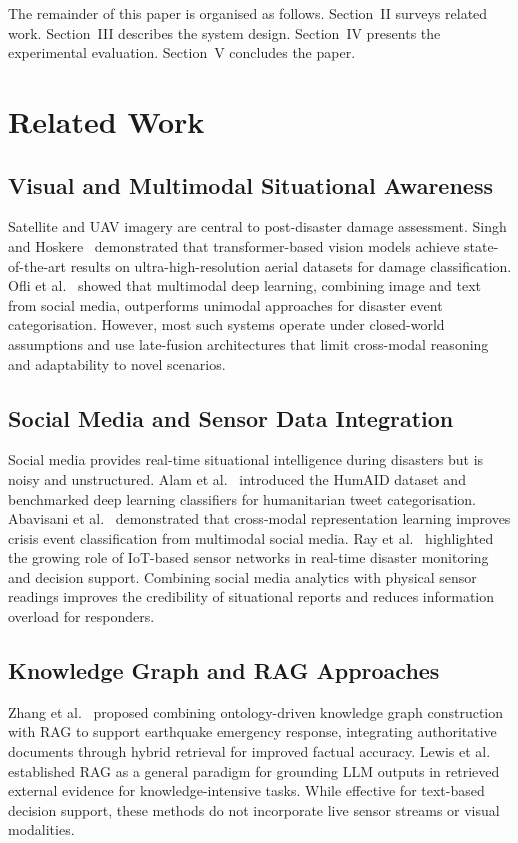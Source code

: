 \documentclass[conference]{IEEEtran}
\begin{document}
The remainder of this paper is organised as follows. Section~II surveys
related work. Section~III describes the system design. Section~IV presents
the experimental evaluation. Section~V concludes the paper.

\section{Related Work}

\subsection{Visual and Multimodal Situational Awareness}
Satellite and UAV imagery are central to post-disaster damage assessment.
Singh and Hoskere~\cite{b15} demonstrated that transformer-based vision models
achieve state-of-the-art results on ultra-high-resolution aerial datasets for
damage classification. Ofli et al.~\cite{b16} showed that multimodal deep
learning, combining image and text from social media, outperforms unimodal
approaches for disaster event categorisation. However, most such systems
operate under closed-world assumptions and use late-fusion architectures that
limit cross-modal reasoning and adaptability to novel scenarios.

\subsection{Social Media and Sensor Data Integration}
Social media provides real-time situational intelligence during disasters but
is noisy and unstructured. Alam et al.~\cite{b18} introduced the HumAID
dataset and benchmarked deep learning classifiers for humanitarian tweet
categorisation. Abavisani et al.~\cite{b19} demonstrated that cross-modal
representation learning improves crisis event classification from multimodal
social media. Ray et al.~\cite{b20} highlighted the growing role of IoT-based
sensor networks in real-time disaster monitoring and decision support. Combining
social media analytics with physical sensor readings improves the credibility
of situational reports and reduces information overload for responders.

\subsection{Knowledge Graph and RAG Approaches}
Zhang et al.~\cite{b13} proposed combining ontology-driven knowledge graph
construction with RAG to support earthquake emergency response, integrating
authoritative documents through hybrid retrieval for improved factual accuracy.
Lewis et al.~\cite{b6} established RAG as a general paradigm for grounding
LLM outputs in retrieved external evidence for knowledge-intensive tasks.
While effective for text-based decision support, these methods do not
incorporate live sensor streams or visual modalities.
\end{document}
